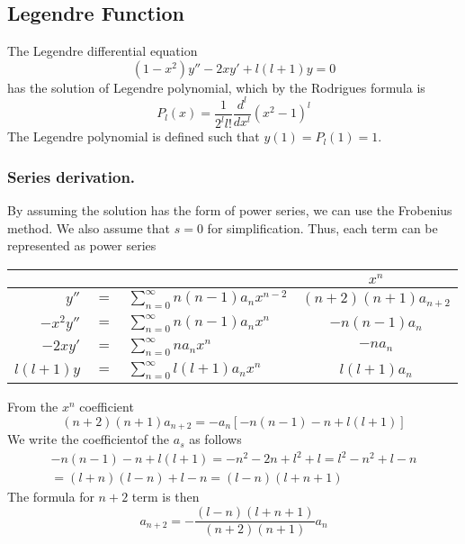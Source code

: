 \documentclass[../main.tex]{subfiles}
\begin{document}
\subsection*{Legendre Function}
The Legendre differential equation
\begin{equation*}
    (1-x^2)y''-2xy'+l(l+1)y=0
\end{equation*}
has the solution of Legendre polynomial, which by the Rodrigues formula is 
\begin{equation*}
    P_l(x)=\frac{1}{2^ll!}\frac{d^l}{dx^l}(x^2-1)^l
\end{equation*}
The Legendre polynomial is defined such that $y(1)=P_l(1)=1$.

\subsubsection*{Series derivation.} By assuming the solution has the form of power series, we can use the Frobenius method. We also assume that $s=0$ for simplification. Thus, each term can be represented as power series
\begin{center}
    \begin{tabular}{r c l c}
        \toprule
        &&&$x^n$\\
        \midrule
        $y''$&$=$&$\displaystyle\sum_{n=0}^{\infty} n(n-1)a_nx^{n-2}$ &$(n+2)(n+1)a_{n+2}$ \\
        $-x^2y''$&$=$&$\displaystyle\sum_{n=0}^{\infty} n(n-1)a_nx^{n}$ &$-n(n-1)a_n$ \\
        $-2xy'$&$=$&$\displaystyle\sum_{n=0}^{\infty} na_nx^{n}$ & $-na_n$\\
        $l(l+1)y$&$=$&$\displaystyle\sum_{n=0}^{\infty} l(l+1)a_nx^{n}$ & $l(l+1)a_n$\\
        \bottomrule
    \end{tabular}
\end{center}
From the $x^n$ coefficient
\begin{equation*}
    (n+2)(n+1)a_{n+2}=-a_n[-n(n-1)-n+l(l+1)]
\end{equation*}
We write the coefficientof the $a_s$ as follows
\begin{multline*}
    -n(n-1)-n+l(l+1)=-n^2-2n+l^2+l=l^2-n^2+l-n\\
    =(l+n)(l-n)+l-n=(l-n)(l+n+1)
\end{multline*}
The formula for $n+2$ term is then
\begin{equation*}
    a_{n+2}=-\frac{(l-n)(l+n+1)}{(n+2)(n+1)}a_n
\end{equation*}
\end{document}
